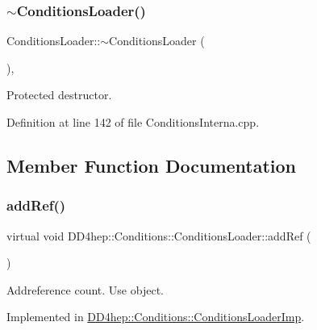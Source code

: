 \subsubsection{\texorpdfstring{$\sim$\+Conditions\+Loader()}{~ConditionsLoader()}}
{\footnotesize\ttfamily Conditions\+Loader\+::$\sim$\+Conditions\+Loader (\begin{DoxyParamCaption}{ }\end{DoxyParamCaption})\hspace{0.3cm}{\ttfamily [protected]}, {\ttfamily [virtual]}}



Protected destructor. 



Definition at line 142 of file Conditions\+Interna.\+cpp.



\subsection{Member Function Documentation}
\hypertarget{class_d_d4hep_1_1_conditions_1_1_conditions_loader_aec8e8abc8bbb54bf20f75c8197b8e71f}{}\label{class_d_d4hep_1_1_conditions_1_1_conditions_loader_aec8e8abc8bbb54bf20f75c8197b8e71f} 
\subsubsection{\texorpdfstring{add\+Ref()}{addRef()}}
{\footnotesize\ttfamily virtual void D\+D4hep\+::\+Conditions\+::\+Conditions\+Loader\+::add\+Ref (\begin{DoxyParamCaption}{ }\end{DoxyParamCaption})\hspace{0.3cm}{\ttfamily [pure virtual]}}



Addreference count. Use object. 



Implemented in \hyperlink{class_d_d4hep_1_1_conditions_1_1_conditions_loader_imp_a6302206e3ebcdf712425df5468598e2c}{D\+D4hep\+::\+Conditions\+::\+Conditions\+Loader\+Imp}.

\hypertarget{class_d_d4hep_1_1_conditions_1_1_conditions_loader_a9705bbf09205a5f20a979ae3fe1005bb}{}\label{class_d_d4hep_1_1_conditions_1_1_conditions_loader_a9705bbf09205a5f20a979ae3fe1005bb} 
